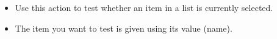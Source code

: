 \begin{itemize}
\item Use this action to test whether an item in a list is currently selected. 
\item The item you want to test is given using its value (name).   
\end{itemize}

